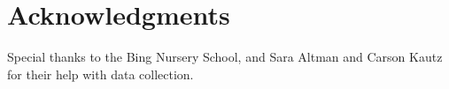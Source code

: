 \documentclass[10pt,letterpaper]{article}
\begin{document}
\section{Acknowledgments}

Special thanks to the Bing Nursery School, and Sara Altman and Carson Kautz for their help with data collection. 



\setlength{\bibleftmargin}{.125in} \setlength{\bibindent}{-\bibleftmargin}


\end{document}
